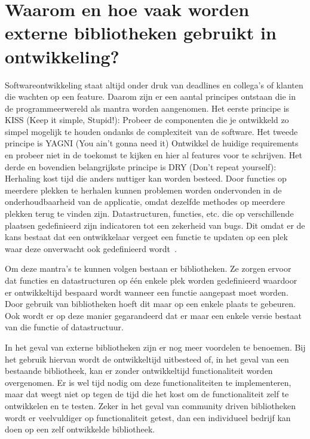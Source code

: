 \section{Waarom en hoe vaak worden externe bibliotheken gebruikt in ontwikkeling?}\label{sec:waarom-hoe}
Softwareontwikkeling staat altijd onder druk van deadlines en collega's of klanten die wachten op een feature. Daarom zijn er een aantal principes ontstaan die in de programmeerwereld als mantra worden aangenomen. Het eerste principe is KISS (Keep it simple, Stupid!): Probeer de componenten die je ontwikkeld zo simpel mogelijk te houden ondanks de complexiteit van de software. Het tweede principe is YAGNI (You ain't gonna need it) Ontwikkel de huidige requirements en probeer niet in de toekomst te kijken en hier al features voor te schrijven. Het derde en bovendien belangrijkste principe is DRY (Don't repeat yourself): Herhaling kost tijd die anders nuttiger kan worden besteed. Door functies op meerdere plekken te herhalen kunnen problemen worden ondervonden in de onderhoudbaarheid van de applicatie, omdat dezelfde methodes op meerdere plekken terug te vinden zijn. Datastructuren, functies, etc. die op verschillende plaatsen gedefinieerd zijn indicatoren tot een zekerheid van bugs. Dit omdat er de kans bestaat dat een ontwikkelaar vergeet een functie te updaten op een plek waar deze onverwacht ook gedefinieerd wordt~\citep{Papadopoulo:2021}.

Om deze mantra's te kunnen volgen bestaan er bibliotheken. Ze zorgen ervoor dat functies en datastructuren op één enkele plek worden gedefinieerd waardoor er ontwikkeltijd bespaard wordt wanneer een functie aangepast moet worden. Door gebruik van bibliotheken hoeft dit maar op een enkele plaats te gebeuren. Ook wordt er op deze manier gegarandeerd dat er maar een enkele versie bestaat van die functie of datastructuur.

In het geval van externe bibliotheken zijn er nog meer voordelen te benoemen. Bij het gebruik hiervan wordt de ontwikkeltijd uitbesteed of, in het geval van een bestaande bibliotheek, kan er zonder ontwikkeltijd functionaliteit worden overgenomen. Er is wel tijd nodig om deze functionaliteiten te implementeren, maar dat weegt niet op tegen de tijd die het kost om de functionaliteit zelf te ontwikkelen en te testen. Zeker in het geval van community driven bibliotheken wordt er veelvuldiger op functionaliteit getest, dan een individueel bedrijf kan doen op een zelf ontwikkelde bibliotheek.

